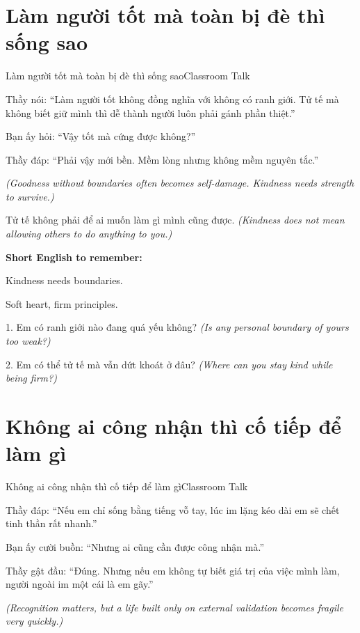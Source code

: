 \section{Làm người tốt mà toàn bị đè thì sống sao}
\begin{truyen}{Làm người tốt mà toàn bị đè thì sống sao}{Classroom Talk}

Thầy nói: ``Làm người tốt không đồng nghĩa với không có ranh giới. Tử tế mà không biết giữ mình thì dễ thành người luôn phải gánh phần thiệt.''

Bạn ấy hỏi: ``Vậy tốt mà cứng được không?''

Thầy đáp: ``Phải vậy mới bền. Mềm lòng nhưng không mềm nguyên tắc.''

\textit{(Goodness without boundaries often becomes self-damage. Kindness needs strength to survive.)}
\end{truyen}

\begin{baihoc}
Tử tế không phải để ai muốn làm gì mình cũng được.
\textit{(Kindness does not mean allowing others to do anything to you.)}
\end{baihoc}

\begin{ghinhoanh}
\textbf{Short English to remember:}

Kindness needs boundaries.

Soft heart, firm principles.
\end{ghinhoanh}

\begin{tuhocnhanh}
1. Em có ranh giới nào đang quá yếu không? \textit{(Is any personal boundary of yours too weak?)}

2. Em có thể tử tế mà vẫn dứt khoát ở đâu? \textit{(Where can you stay kind while being firm?)}
\end{tuhocnhanh}
\ngancach

\section{Không ai công nhận thì cố tiếp để làm gì}
\begin{truyen}{Không ai công nhận thì cố tiếp để làm gì}{Classroom Talk}

Thầy đáp: ``Nếu em chỉ sống bằng tiếng vỗ tay, lúc im lặng kéo dài em sẽ chết tinh thần rất nhanh.''

Bạn ấy cười buồn: ``Nhưng ai cũng cần được công nhận mà.''

Thầy gật đầu: ``Đúng. Nhưng nếu em không tự biết giá trị của việc mình làm, người ngoài im một cái là em gãy.''

\textit{(Recognition matters, but a life built only on external validation becomes fragile very quickly.)}
\end{truyen}

